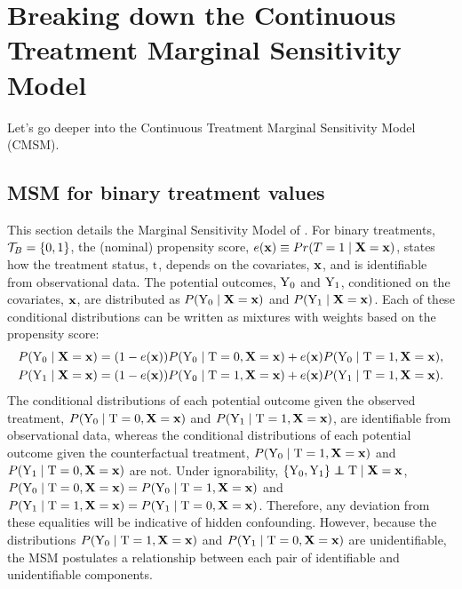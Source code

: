 \section{Breaking down the Continuous Treatment Marginal Sensitivity Model}
\label{app:cmsm}
Let's go deeper into the Continuous Treatment Marginal Sensitivity Model (CMSM).


\subsection{MSM for binary treatment values}
\label{app:msm}
This section details the Marginal Sensitivity Model of \cite{tan2006msm}.
For binary treatments, $\mathcal{T}_{B} = \{0, 1\}$, the (nominal) propensity score, $e(\mathbf{x}) \equiv Pr(T=1 \mid \mathbf{X}=\mathbf{x})$, states how the treatment status, $\mathrm{t}$, depends on the covariates, $\mathbf{x}$, and is identifiable from observational data.
The potential outcomes, $\mathrm{Y}_{0}$ and $\mathrm{Y}_1$, conditioned on the covariates, $\mathbf{x}$, are distributed as $P(\mathrm{Y}_{0} \mid \mathbf{X}=\mathbf{x})$ and $P(\mathrm{Y}_{1} \mid \mathbf{X}=\mathbf{x})$.
Each of these conditional distributions can be written as mixtures with weights based on the propensity score:
\begin{equation}
    \begin{split}
        P(\mathrm{Y}_0 \mid \mathbf{X}=\mathbf{x}) &= (1 - e(\mathbf{x})) P(\mathrm{Y}_0 \mid \mathrm{T} = 0, \mathbf{X}=\mathbf{x}) + e(\mathbf{x}) P(\mathrm{Y}_0 \mid \mathrm{T} = 1, \mathbf{X}=\mathbf{x}), \\
        P(\mathrm{Y}_1 \mid \mathbf{X}=\mathbf{x}) &= (1 - e(\mathbf{x})) P(\mathrm{Y}_0 \mid \mathrm{T} = 1, \mathbf{X}=\mathbf{x}) + e(\mathbf{x}) P(\mathrm{Y}_1 \mid \mathrm{T} = 1, \mathbf{X}=\mathbf{x}).
    \end{split}
\end{equation}
The conditional distributions of each potential outcome given the observed treatment, $P(\mathrm{Y}_0 \mid \mathrm{T} = 0, \mathbf{X}=\mathbf{x})$ and $P(\mathrm{Y}_1 \mid \mathrm{T} = 1, \mathbf{X}=\mathbf{x})$, are identifiable from observational data, whereas the conditional distributions of each potential outcome given the counterfactual treatment, $P(\mathrm{Y}_0 \mid \mathrm{T} = 1, \mathbf{X}=\mathbf{x})$ and $P(\mathrm{Y}_1 \mid \mathrm{T} = 0, \mathbf{X}=\mathbf{x})$ are not.
Under ignorability, $\{\Y_0, \Y_1\} \indep \Tf \mid \X=\x$, $P(\mathrm{Y}_0 \mid \mathrm{T} = 0, \mathbf{X}=\mathbf{x}) = P(\mathrm{Y}_0 \mid \mathrm{T} = 1, \mathbf{X}=\mathbf{x})$ and $P(\mathrm{Y}_1 \mid \mathrm{T} = 1, \mathbf{X}=\mathbf{x}) = P(\mathrm{Y}_1 \mid \mathrm{T} = 0, \mathbf{X}=\mathbf{x})$.
Therefore, any deviation from these equalities will be indicative of hidden confounding.
However, because the distributions  $P(\mathrm{Y}_0 \mid \mathrm{T} = 1, \mathbf{X}=\mathbf{x})$ and $P(\mathrm{Y}_1 \mid \mathrm{T} = 0, \mathbf{X}=\mathbf{x})$ are unidentifiable, the MSM postulates a relationship between each pair of identifiable and unidentifiable components.

